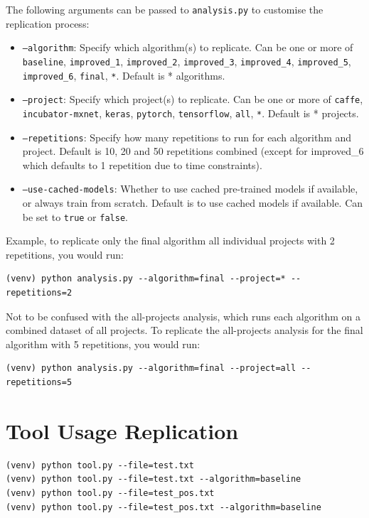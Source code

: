 \documentclass{article}
\begin{document}
The following arguments can be passed to \texttt{analysis.py} to customise the replication process:
\begin{itemize}
    \item \texttt{--algorithm}: Specify which algorithm(s) to replicate. Can be one or more of \texttt{baseline}, \texttt{improved\_1}, \texttt{improved\_2}, \texttt{improved\_3}, \texttt{improved\_4}, \texttt{improved\_5}, \texttt{improved\_6}, \texttt{final}, \texttt{*}. Default is * algorithms.
    \item \texttt{--project}: Specify which project(s) to replicate. Can be one or more of \texttt{caffe}, \texttt{incubator-mxnet}, \texttt{keras}, \texttt{pytorch}, \texttt{tensorflow}, \texttt{all}, \texttt{*}. Default is * projects.
    \item \texttt{--repetitions}: Specify how many repetitions to run for each algorithm and project. Default is 10, 20 and 50 repetitions combined (except for improved\_6 which defaults to 1 repetition due to time constraints).
    \item \texttt{--use-cached-models}: Whether to use cached pre-trained models if available, or always train from scratch. Default is to use cached models if available. Can be set to \texttt{true} or \texttt{false}.
\end{itemize}

Example, to replicate only the final algorithm all individual projects with 2 repetitions, you would run:
\begin{verbatim}
(venv) python analysis.py --algorithm=final --project=* --repetitions=2
\end{verbatim}

Not to be confused with the all-projects analysis, which runs each algorithm on a combined dataset of all projects. To replicate the all-projects analysis for the final algorithm with 5 repetitions, you would run:
\begin{verbatim}
(venv) python analysis.py --algorithm=final --project=all --repetitions=5
\end{verbatim}


\section*{Tool Usage Replication}

\begin{verbatim}
(venv) python tool.py --file=test.txt
(venv) python tool.py --file=test.txt --algorithm=baseline
(venv) python tool.py --file=test_pos.txt
(venv) python tool.py --file=test_pos.txt --algorithm=baseline
\end{verbatim}
\end{document}
